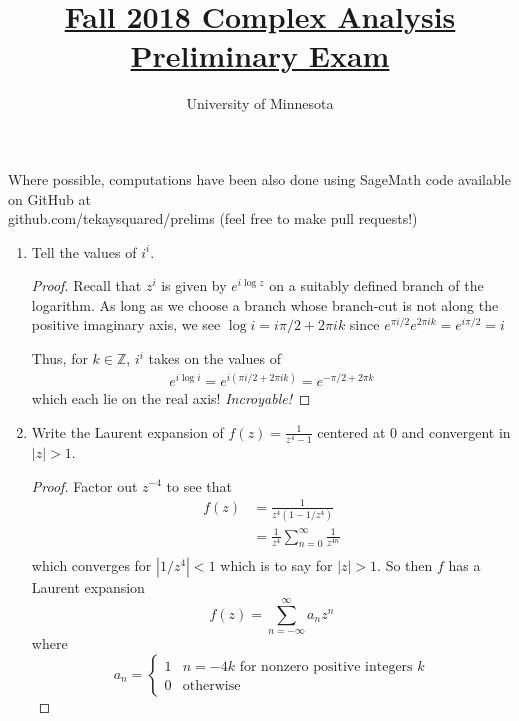 \documentclass{article}
\title{\href{https://math.umn.edu/sites/math.umn.edu/files/exams/complexf18.pdf}{Fall 2018 Complex Analysis Preliminary Exam}}
\author{University of Minnesota}
\date{}
\begin{document}
\maketitle

Where possible, computations have been also done using SageMath code available on GitHub at \\ github.com/tekaysquared/prelims (feel free to make pull requests!)

\begin{enumerate}

	\item Tell the values of $i^i$.
	
	\begin{proof}
		Recall that $z^i$ is given by $e^{i \log z}$ on a suitably defined branch of the logarithm.
		As long as we choose a branch whose branch-cut is not along the positive imaginary axis, we see
		$\log i = i \pi/2 + 2\pi  i k$ since $e^{\pi i /2}e^{2\pi i k} = e^{i \pi/2} = i$
		
		Thus, for $k \in \mathbb{Z}$, $i^i$ takes on the values of
		\begin{align*}
			e^{i \log i } = e^{ i(  \pi i/2 + 2\pi i k)} = e^{- \pi/2 + 2\pi k}
		\end{align*}
		which each lie on the real axis! \emph{Incroyable!}
		
	\end{proof}	
	\setcounter{enumi}{1}
	
	\item Write the Laurent expansion of $f(z) = \frac{1}{z^4-1}$ centered at $0$ and convergent in $|z|>1$.
	
	\begin{proof}
		Factor out $z^{-4}$ to see that 
		\begin{align*}
			f(z) &= \frac{1}{z^4 (1 - {1}/{z^4})}\\
			&= \frac{1}{z^4} \sum_{n=0}^\infty \frac{1}{z^{4n}} \\
		\end{align*}
		which converges for $|1/z^4| <1$ which is to say for $|z|>1$.
		So then $f$ has a Laurent expansion
		\[f(z) = \sum_{n = - \infty}^{\infty} a_n z^{n} \]
		where 
		\[ a_n = \begin{cases}
						  1 & n = -4k \text{ for nonzero positive integers }k\\
						  0 & \text{otherwise}
		\end{cases}\]
	\end{proof} 
	

\end{enumerate}
\end{document}
